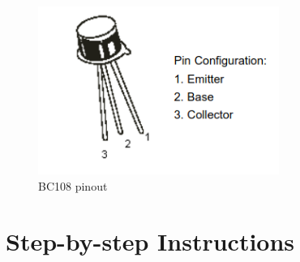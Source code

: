 \documentclass[a4paper,12pt]{article}
\begin{document}
\begin{figure}[h!]
  \begin{center}
    \includegraphics[width=0.7\textwidth]{bc108-pinout.png}
  \end{center}
  \caption{BC108 pinout}
\end{figure}


\section{Step-by-step Instructions}
\label{sec:steps}
\end{document}
